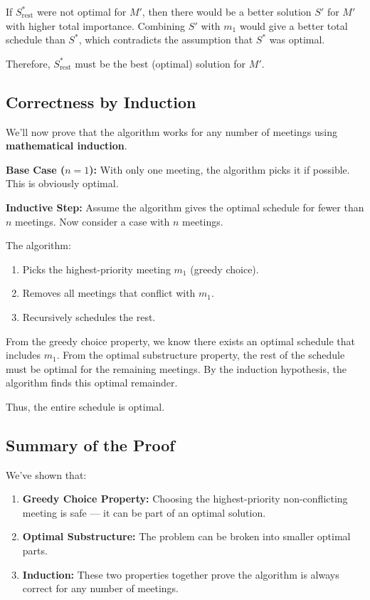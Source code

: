 \documentclass[conference]{IEEEtran}
\begin{document}
If $S^*_{\text{rest}}$ were not optimal for $M'$, then there would be a better solution $S'$ for $M'$ with higher total importance.  
Combining $S'$ with $m_1$ would give a better total schedule than $S^*$, which contradicts the assumption that $S^*$ was optimal.

Therefore, $S^*_{\text{rest}}$ must be the best (optimal) solution for $M'$.

\subsection{Correctness by Induction}

We’ll now prove that the algorithm works for any number of meetings using \textbf{mathematical induction}.

\textbf{Base Case ($n = 1$):}  
With only one meeting, the algorithm picks it if possible. This is obviously optimal.

\textbf{Inductive Step:}  
Assume the algorithm gives the optimal schedule for fewer than $n$ meetings.  
Now consider a case with $n$ meetings.

The algorithm:
\begin{enumerate}
    \item Picks the highest-priority meeting $m_1$ (greedy choice).
    \item Removes all meetings that conflict with $m_1$.
    \item Recursively schedules the rest.
\end{enumerate}

From the greedy choice property, we know there exists an optimal schedule that includes $m_1$.  
From the optimal substructure property, the rest of the schedule must be optimal for the remaining meetings.  
By the induction hypothesis, the algorithm finds this optimal remainder.  

Thus, the entire schedule is optimal.

\subsection{Summary of the Proof}

We’ve shown that:

\begin{enumerate}
    \item \textbf{Greedy Choice Property:} Choosing the highest-priority non-conflicting meeting is safe --- it can be part of an optimal solution.
    \item \textbf{Optimal Substructure:} The problem can be broken into smaller optimal parts.
    \item \textbf{Induction:} These two properties together prove the algorithm is always correct for any number of meetings.
\end{enumerate}
\end{document}
